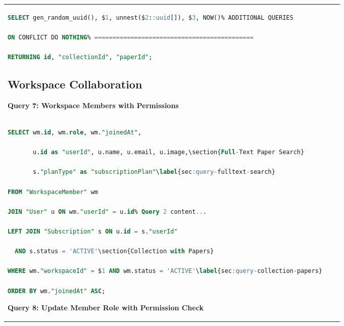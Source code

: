 \begin{itemize}
\begin{tabular}{@{}lcc@{}}
\begin{lstlisting}[language=SQL,basicstyle=\tiny\ttfamily]
SELECT gen_random_uuid(), $1, unnest($2::uuid[]), $3, NOW()% ADDITIONAL QUERIES

ON CONFLICT DO NOTHING% ============================================

RETURNING id, "collectionId", "paperId";

\end{lstlisting}%


\subsection{Workspace Collaboration}%


\textbf{Query 7: Workspace Members with Permissions}%

\begin{lstlisting}[language=SQL,basicstyle=\tiny\ttfamily]% 4. Optimization notes

SELECT wm.id, wm.role, wm."joinedAt",

       u.id as "userId", u.name, u.email, u.image,\section{Full-Text Paper Search}

       s."planType" as "subscriptionPlan"\label{sec:query-fulltext-search}

FROM "WorkspaceMember" wm

JOIN "User" u ON wm."userId" = u.id% Query 2 content...

LEFT JOIN "Subscription" s ON u.id = s."userId" 

  AND s.status = 'ACTIVE'\section{Collection with Papers}

WHERE wm."workspaceId" = $1 AND wm.status = 'ACTIVE'\label{sec:query-collection-papers}

ORDER BY wm."joinedAt" ASC;

\end{lstlisting}%



\textbf{Query 8: Update Member Role with Permission Check}%


\end{tabular}
\end{itemize}

